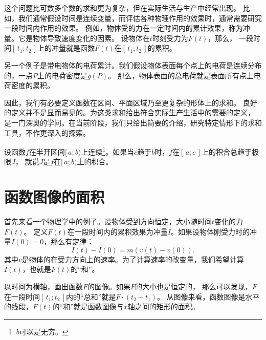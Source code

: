 \documentclass[12pt,UTF8]{ctexbook}
\begin{document}
这个问题比可数多个数的求和更为复杂，但在实际生活与生产中经常出现。
比如，我们通常假设时间是连续变量，而评估各种物理作用的效果时，通常需要研究一段时间内作用的效果。
例如，物体受的力在一定时间内的累计效果，称为冲量。它是物体导致速度变化的因素。
设物体在$t$时刻受力为$F(t)$，那么，
一段时间$[\,t_1; t_2\,]$上的冲量就是函数$F(t)$在$[\,t_1; t_2\,]$的累积。

另一个例子是带电物体的电荷累计。我们假设物体表面每个点上的电荷是连续分布的，一点$P$上的电荷密度是$g(P)$。
那么，物体表面的总电荷就是表面所有点上电荷密度的累积。

因此，我们有必要定义函数在区间、平面区域乃至更复杂的形体上的求和。
良好的定义并不是显而易见的。为这类求和给出符合实际生产生活中的需要的定义，
是一门深奥的学问。在当前阶段，我们只给出简要的介绍，研究特定情形下的求和工具，不作更深入的探索。

\begin{df}
    设函数$f$在半开区间$[\,a;b)$上连续\footnote{$b$可以是无穷。}。如果当$c$趋于$b$时，$f$在$[\,a;c\,]$上的积合总趋于极限$J$，
    就说$J$是$f$在$[\,a;b)$上的积合。
\end{df}\section{函数图像的面积}

首先来看一个物理学中的例子。设物体受到方向恒定，大小随时间$t$变化的力$F(t)$。
定义$F(t)$在一段时间内的累积效果为冲量$I$。如果设物体刚受力时的冲量$I(0) = 0$，那么有定律：
$$ I(t) - I(0) = m(v(t) - v(0)).$$
其中$v$是物体的在受力方向上的速率。为了计算速率的改变量，我们希望计算$I(t)$，也就是$F(t)$的“和”。

以时间为横轴，画出函数$F$的图像。如果$F$的大小也是恒定的，
那么可以发现，$F$在一段时间$[\,t_1; t_2\,]$内的“总和”就是$F \cdot (t_2 - t_1)$。
从图像来看，函数图像是水平的线段，$F(t)$的“和”就是函数图像与$x$轴之间的矩形的面积。
\end{document}
